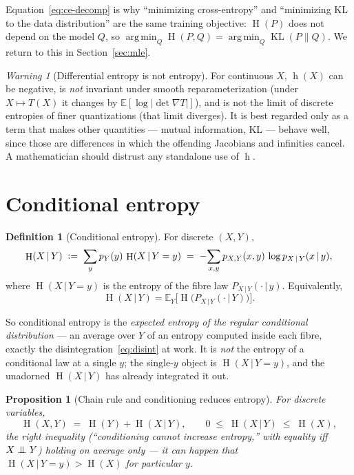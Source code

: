 \documentclass[11pt,oneside]{report}
\theoremstyle{plain}
\newtheorem{proposition}[theorem]{Proposition}
\theoremstyle{definition}
\newtheorem{definition}[theorem]{Definition}
\theoremstyle{remark}
\newtheorem{warning}[theorem]{Warning}
\newcommand{\E}{\mathbb{E}}
\newcommand{\defeq}{\vcentcolon=}
\newcommand{\given}{\,\vert\,}
\newcommand{\indep}{\mathrel{\perp\mkern-10mu\perp}}
\DeclareMathOperator{\KL}{KL}
\DeclareMathOperator*{\argmin}{arg\,min}
\DeclareMathOperator{\Ent}{H}        %
\DeclareMathOperator{\diffent}{h}    %
\numberwithin{equation}{chapter}
\begin{document}
Equation~\eqref{eq:ce-decomp} is why ``minimizing cross-entropy'' and
``minimizing KL to the data distribution'' are the same training objective:
$\Ent(P)$ does not depend on the model $Q$, so
$\argmin_Q \Ent(P,Q)=\argmin_Q\KL(P\|Q)$. We return to this in
Section~\ref{sec:mle}.

\begin{warning}[Differential entropy is not entropy]\label{warn:diffent}
For continuous $X$, $\diffent(X)$ can be negative, is \emph{not} invariant
under smooth reparameterization (under $X\mapsto T(X)$ it changes by
$\E[\log|\det\nabla T|]$), and is not the limit of discrete entropies of
finer quantizations (that limit diverges). It is best regarded only as a
term that makes other quantities --- mutual information, KL --- behave well,
since those are differences in which the offending Jacobians and infinities
cancel. A mathematician should distrust any standalone use of $\diffent$.
\end{warning}

\section{Conditional entropy}

\begin{definition}[Conditional entropy]\label{def:cond-entropy}
For discrete $(X,Y)$,
\begin{equation}\label{eq:cond-entropy}
  \Ent(X\given Y)\;\defeq\;\sum_{y}p_Y(y)\,\Ent(X\given Y=y)
   \;=\;-\!\sum_{x,y}p_{X,Y}(x,y)\,\log p_{X\given Y}(x\given y),
\end{equation}
where $\Ent(X\given Y=y)$ is the entropy of the fibre law
$P_{X\given Y}(\cdot\given y)$. Equivalently,
\[
  \Ent(X\given Y)=\E_Y\bigl[\Ent\bigl(P_{X\given Y}(\cdot\given Y)\bigr)\bigr].
\]
\end{definition}

So conditional entropy is the \emph{expected entropy of the regular
conditional distribution} --- an average over $Y$ of an entropy computed
inside each fibre, exactly the disintegration~\eqref{eq:disint} at work.
It is \emph{not} the entropy of a conditional law at a single $y$; the
single-$y$ object is $\Ent(X\given Y=y)$, and the unadorned $\Ent(X\given
Y)$ has already integrated it out.

\begin{proposition}[Chain rule and conditioning reduces entropy]
\label{prop:entropy-chain}
For discrete variables,
\begin{equation}\label{eq:entropy-chain}
  \Ent(X,Y)\;=\;\Ent(Y)+\Ent(X\given Y),\qquad
  0\;\le\;\Ent(X\given Y)\;\le\;\Ent(X),
\end{equation}
the right inequality (``conditioning cannot increase entropy,'' with
equality iff $X\indep Y$) holding \emph{on average} only --- it can happen
that $\Ent(X\given Y=y)>\Ent(X)$ for particular $y$.
\end{proposition}
\end{document}
